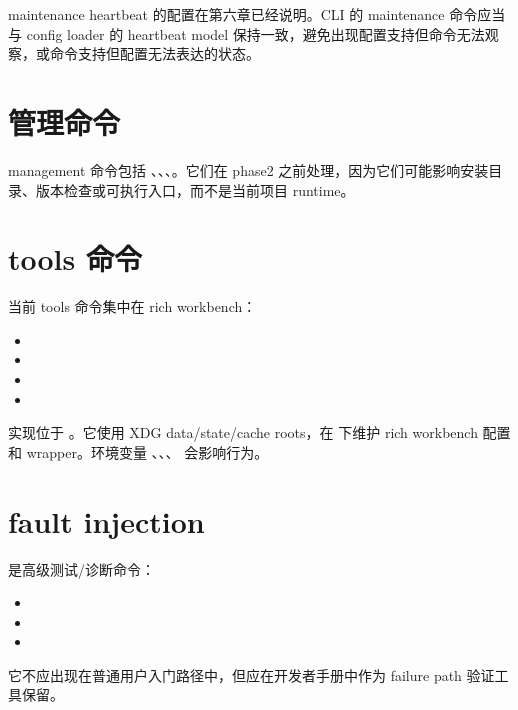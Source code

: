 maintenance heartbeat 的配置在第六章已经说明。CLI 的 maintenance 命令应当与 config loader 的 heartbeat model 保持一致，避免出现配置支持但命令无法观察，或命令支持但配置无法表达的状态。

\section{管理命令}

management 命令包括 、、、。它们在 phase2 之前处理，因为它们可能影响安装目录、版本检查或可执行入口，而不是当前项目 runtime。

\section{tools 命令}

当前 tools 命令集中在 rich workbench：

\begin{itemize}
  \item {}
  \item {}
  \item {}
  \item {}
\end{itemize}

实现位于 。它使用 XDG data/state/cache roots，在  下维护 rich workbench 配置和 wrapper。环境变量 、、、 会影响行为。

\section{fault injection}

 是高级测试/诊断命令：

\begin{itemize}
  \item {}
  \item {}
  \item {}
\end{itemize}

它不应出现在普通用户入门路径中，但应在开发者手册中作为 failure path 验证工具保留。

